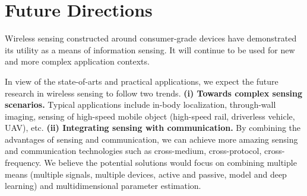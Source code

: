 \section{Future Directions}

Wireless sensing constructed around consumer-grade devices have demonstrated its utility as a means of information sensing. It will
continue to be used for new and more complex application contexts.

In view of the state-of-arts and practical applications, we expect the future research in wireless sensing to follow two trends.
\textbf{(i) Towards complex sensing scenarios.} Typical applications include in-body localization, through-wall imaging, sensing of
high-speed mobile object (high-speed rail, driverless vehicle, UAV), etc. \textbf{(ii) Integrating sensing with communication.} By
combining the advantages of sensing and communication, we can achieve more amazing sensing and communication technologies such as
cross-medium, cross-protocol, cross-frequency. We believe the potential solutions would focus on combining multiple means (multiple
signals, multiple devices, active and passive, model and deep learning) and multidimensional parameter estimation.
